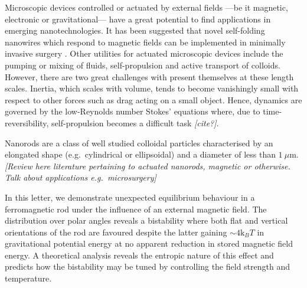 \documentclass[aps,prl,twocolumn,superscriptaddress]{revtex4-1}
\newcommand{\kk}{\mathrm{k}_B}
\begin{document}
Microscopic devices controlled or actuated by external fields ---be it magnetic, electronic or gravitational--- have a great potential to find applications in emerging nanotechnologies. It has been suggested that novel self-folding nanowires which respond to magnetic fields can be implemented in minimally invasive surgery \cite{Xi2013,Solovev2012}. Other utilities for actuated microscopic devices include the pumping or mixing of fluids, self-propulsion and active transport of colloids. However, there are two great challenges with present themselves at these length scales. Inertia, which scales with volume, tends to become vanishingly small with respect to other forces such as drag acting on a small object. Hence, dynamics are governed by the low-Reynolds number Stokes' equations where, due to time-reversibility, self-propulsion becomes a difficult task \emph{[cite?]}. 

Nanorods are a class of well studied colloidal particles characterised by an elongated shape (e.g.\ cylindrical or ellipsoidal) and a diameter of less than $1\ \mu$m. \emph{[Review here literature pertaining to actuated nanorods, magnetic or otherwise. Talk about applications e.g.\ microsurgery]}

In this letter, we demonstrate unexpected equilibrium behaviour in a ferromagnetic rod under the influence of an external magnetic field. The distribution over polar angles reveals a bistability where both flat and vertical orientations of the rod are favoured despite the latter gaining $\sim 4 \kk T$ in gravitational potential energy at no apparent reduction in stored magnetic field energy. A theoretical analysis reveals the entropic nature of this effect and predicts how the bistability may be tuned by controlling the field strength and temperature.
\end{document}

